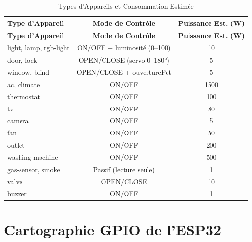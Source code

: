 \begin{center}
\begin{longtable}{lcc}
\caption{Types d'Appareils et Consommation Estimée}\label{tab:device_types}\\
\toprule
\textbf{Type d'Appareil} & \textbf{Mode de Contrôle} & \textbf{Puissance Est. (W)} \\
\midrule
\endfirsthead
\toprule
\textbf{Type d'Appareil} & \textbf{Mode de Contrôle} & \textbf{Puissance Est. (W)} \\
\midrule
\endhead
\bottomrule
\endfoot
light, lamp, rgb-light & ON/OFF + luminosité (0--100) & 10 \\
door, lock             & OPEN/CLOSE (servo 0--180°)   & 5 \\
window, blind          & OPEN/CLOSE + ouverturePct    & 5 \\
ac, climate            & ON/OFF                       & 1500 \\
thermostat             & ON/OFF                       & 100 \\
tv                     & ON/OFF                       & 80 \\
camera                 & ON/OFF                       & 5 \\
fan                    & ON/OFF                       & 50 \\
outlet                 & ON/OFF                       & 200 \\
washing-machine        & ON/OFF                       & 500 \\
gas-sensor, smoke      & Passif (lecture seule)       & 1 \\
valve                  & OPEN/CLOSE                   & 10 \\
buzzer                 & ON/OFF                       & 1 \\
\end{longtable}
\end{center}

\section{Cartographie GPIO de l'ESP32}

